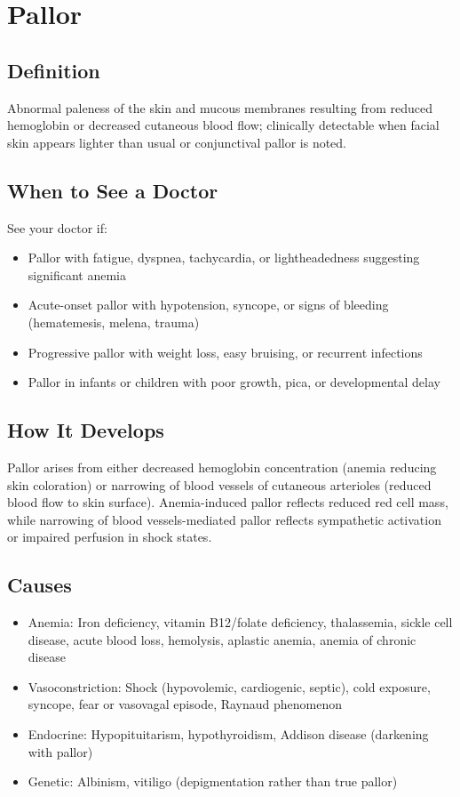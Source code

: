 \chapter{Pallor}

\section*{Definition}
Abnormal paleness of the skin and mucous membranes resulting from reduced hemoglobin or decreased cutaneous blood flow; clinically detectable when facial skin appears lighter than usual or conjunctival pallor is noted.

\section*{When to See a Doctor}
See your doctor if:
\begin{itemize}
  \item Pallor with fatigue, dyspnea, tachycardia, or lightheadedness suggesting significant anemia
  \item Acute-onset pallor with hypotension, syncope, or signs of bleeding (hematemesis, melena, trauma)
  \item Progressive pallor with weight loss, easy bruising, or recurrent infections
  \item Pallor in infants or children with poor growth, pica, or developmental delay
\end{itemize}

\section*{How It Develops}
Pallor arises from either decreased hemoglobin concentration (anemia reducing skin coloration) or narrowing of blood vessels of cutaneous arterioles (reduced blood flow to skin surface). Anemia-induced pallor reflects reduced red cell mass, while narrowing of blood vessels-mediated pallor reflects sympathetic activation or impaired perfusion in shock states.

\section*{Causes}
\begin{itemize}
  \item Anemia: Iron deficiency, vitamin B12/folate deficiency, thalassemia, sickle cell disease, acute blood loss, hemolysis, aplastic anemia, anemia of chronic disease
  \item Vasoconstriction: Shock (hypovolemic, cardiogenic, septic), cold exposure, syncope, fear or vasovagal episode, Raynaud phenomenon
  \item Endocrine: Hypopituitarism, hypothyroidism, Addison disease (darkening with pallor)
  \item Genetic: Albinism, vitiligo (depigmentation rather than true pallor)
\end{itemize}

